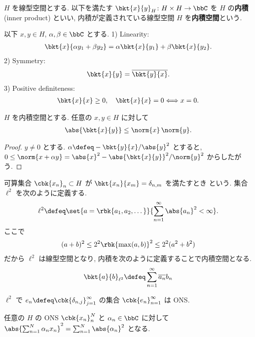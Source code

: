 \documentclass[openany, a4paper, oneside]{jsbook}
\begin{document}
\begin{defn}[内積空間]
$H$ を線型空間とする.
以下を満たす $\bkt{x}{y}_{H} \colon H \times H \to \bbC$ を
$H$ の\textbf{内積}(inner product) といい,
内積が定義されている線型空間 $H$ を\textbf{内積空間}という.

以下 $x, y \in H$, $\alpha, \beta \in \bbC$ とする.
1) \textup{Linearity:}
  \begin{align}
   \bkt{x}{\alpha y_1 + \beta y_2} = \alpha \bkt{x}{y_1} + \beta \bkt{x}{y_2}.
  \end{align}
2) \textup{Symmetry:}
  \begin{align}
   \bkt{x}{y} = \overline{\bkt{y}{x}}.
  \end{align}
3) \textup{Positive definiteness:}
  \begin{align}
   \bkt{x}{x} \geq 0, \quad
   \bkt{x}{x} = 0 \Longleftrightarrow x = 0.
  \end{align}
\end{defn}

\begin{thm}\label{functional_analysis_hilbert_space_yukimi_Schwarz}
 $H$ を内積空間とする.
 任意の $x, y \in H$ に対して
\begin{align}
 \abs{\bkt{x}{y}}
 \leq
 \norm{x} \, \norm{y}.
\end{align}
\end{thm}
\begin{proof}
$y \neq 0$ とする.
$\alpha \defeq - \bkt{y}{x} / \abs{y}^2$ とすると,
$0 \leq \norm{x + \alpha y} = \abs{x}^2 - \abs{\bkt{x}{y}}^2 / \norm{y}^2$ からしたがう.
\end{proof}

\begin{defn}
 可算集合 $\cbk{x_n}_{n} \subset H$ が $\bkt{x_n}{x_m} = \delta_{n,m} $ を満たすとき  という.
 集合 $\ell^2$ を次のように定義する.
 \begin{align}
  \ell^2
  \defeq
  \set{a = \rbk{a_1, a_2, \dots}}{\sum_{n=1}^{\infty} \abs{a_n}^2 < \infty}.
 \end{align}
 ここで
 \begin{align}
  (a+b)^2
  \leq
  2^2 \rbk{\max (a,b)}^2
  \leq
  2^2 (a^2 + b^2)
 \end{align}
 だから $\ell^2$ は線型空間となり,
 内積を次のように定義することで内積空間となる.
 \begin{align}
  \bkt{a}{b}_{\ell^2}
  \defeq
  \sum_{n = 1}^\infty \overline{a_{n}}b_{n}
 \end{align}
\end{defn}
\begin{ex}
 $\ell^2$ で $e_{n} \defeq \cbk{\delta_{n,j}}_{j = 1}^\infty$ の集合 $\cbk{e_{n}}_{n=1}^\infty$ は ONS.
\end{ex}
\begin{ex}\label{functional_analysis_hilbert_space_yukimi_ons}
 任意の $H$ の ONS $\cbk{x_{n}}_{n}^N$ と $\alpha_{n} \in \bbC$ に対して
 $\abs{\sum_{n = 1}^N \alpha_{n} x_{n}}^2 = \sum_{n = 1}^N \abs{\alpha_{n}}^2$ となる.
\end{ex}
\end{document}

